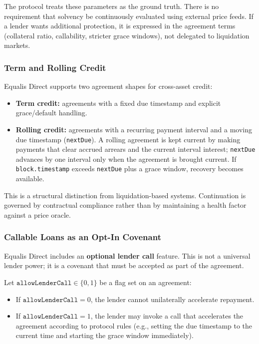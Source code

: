 \documentclass[version=preprint]{iacrcc}
\begin{document}
The protocol treats these parameters as the ground truth. There is no requirement that solvency be continuously evaluated using external price feeds. If a lender wants additional protection, it is expressed in the agreement terms (collateral ratio, callability, stricter grace windows), not delegated to liquidation markets.

\subsubsection{Term and Rolling Credit}

Equalis Direct supports two agreement shapes for cross-asset credit:
\begin{itemize}
  \item \textbf{Term credit:} agreements with a fixed due timestamp and explicit grace/default handling.
  \item \textbf{Rolling credit:} agreements with a recurring payment interval and a moving due timestamp (\texttt{nextDue}). A rolling agreement is kept current by making payments that clear accrued arrears and the current interval interest; \texttt{nextDue} advances by one interval only when the agreement is brought current. If \texttt{block.timestamp} exceeds \texttt{nextDue} plus a grace window, recovery becomes available.
\end{itemize}

This is a structural distinction from liquidation-based systems. Continuation is governed by contractual compliance rather than by maintaining a health factor against a price oracle.

\subsubsection{Callable Loans as an Opt-In Covenant}

Equalis Direct includes an \textbf{optional lender call} feature. This is not a universal lender power; it is a covenant that must be accepted as part of the agreement.

Let $\texttt{allowLenderCall} \in \{0,1\}$ be a flag set on an agreement:
\begin{itemize}
  \item If $\texttt{allowLenderCall} = 0$, the lender cannot unilaterally accelerate repayment.
  \item If $\texttt{allowLenderCall} = 1$, the lender may invoke a call that accelerates the agreement according to protocol rules (e.g., setting the due timestamp to the current time and starting the grace window immediately).
\end{itemize}
\end{document}
